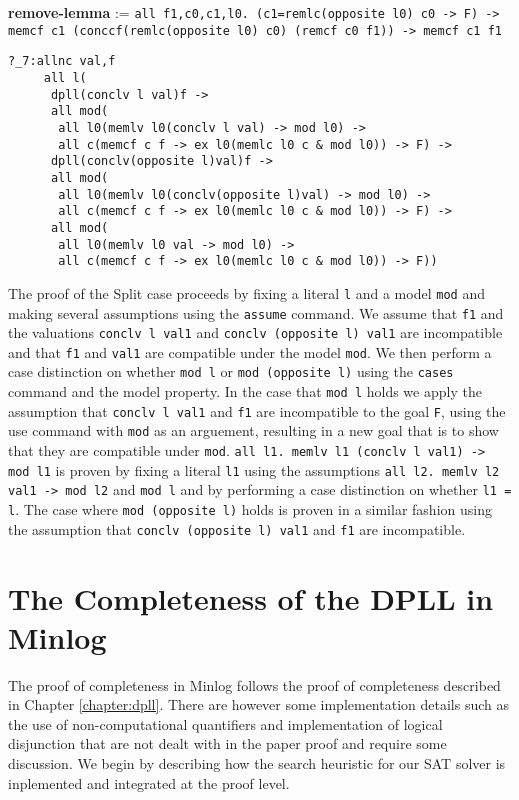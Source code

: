\begin{center}
\textbf{remove-lemma} := \texttt{all f1,c0,c1,l0. (c1=remlc(opposite l0) c0 -> F) -> memcf c1 (conccf(remlc(opposite l0) c0) (remcf c0 f1)) -> memcf c1 f1}  
\end{center}

\begin{lstlisting}[caption = "The Split Case in Minlog"]
?_7:allnc val,f
     all l(
      dpll(conclv l val)f ->
      all mod(
       all l0(memlv l0(conclv l val) -> mod l0) ->
       all c(memcf c f -> ex l0(memlc l0 c & mod l0)) -> F) ->
      dpll(conclv(opposite l)val)f ->
      all mod(
       all l0(memlv l0(conclv(opposite l)val) -> mod l0) ->
       all c(memcf c f -> ex l0(memlc l0 c & mod l0)) -> F) ->
      all mod(
       all l0(memlv l0 val -> mod l0) ->
       all c(memcf c f -> ex l0(memlc l0 c & mod l0)) -> F))
\end{lstlisting}

The proof of the Split case proceeds by fixing a literal \texttt{l} and a model \texttt{mod} and making several assumptions using the \texttt{assume} command. We assume that \texttt{f1} and the valuations \texttt{conclv l val1} and \texttt{conclv (opposite l) val1} are incompatible and that \texttt{f1} and \texttt{val1} are compatible under the model \texttt{mod}. We then perform a case distinction on whether \texttt{mod l}  or \texttt{mod (opposite l)} using the \texttt{cases} command and the model property. In the case that \texttt{mod l} holds we apply the assumption that \texttt{conclv l val1} and \texttt{f1} are incompatible  to the goal \texttt{F}, using the use  command with \texttt{mod} as an arguement, resulting in a new goal that is to show that they are compatible under \texttt{mod}. \texttt{all l1. memlv l1 (conclv l val1) -> mod l1} is proven by fixing a literal \texttt{l1} using the assumptions \texttt{all l2. memlv l2 val1 -> mod l2} and \texttt{mod l} and by performing a case distinction on whether \texttt{l1 = l}. The case where \texttt{mod (opposite l)} holds is proven in a similar fashion using the assumption that \texttt{conclv (opposite l) val1} and \texttt{f1} are incompatible.




\section{The Completeness of the DPLL in Minlog}
The proof of completeness in Minlog follows the proof of completeness described in Chapter \ref{chapter:dpll}. There are however some implementation details such as the use of non-computational quantifiers and implementation of logical disjunction that are not dealt with in the paper proof and require some discussion. We begin by describing how the search heuristic for our SAT solver is inplemented and integrated at the proof level.



